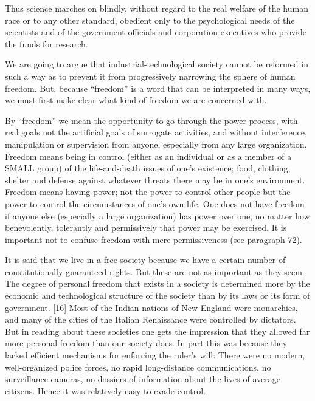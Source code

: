  Thus science marches on blindly, without regard to the real welfare of the human race or to any other standard, obedient only to the psychological needs of the scientists and of the government officials and corporation executives who provide the funds for research.


 We are going to argue that industrial-technological society cannot be reformed in such a way as to prevent it from progressively narrowing the sphere of human freedom. But, because “freedom” is a word that can be interpreted in many ways, we must first make clear what kind of freedom we are concerned with.

 By “freedom” we mean the opportunity to go through the power process, with real goals not the artificial goals of surrogate activities, and without interference, manipulation or supervision from anyone, especially from any large organization. Freedom means being in control (either as an individual or as a member of a SMALL group) of the life-and-death issues of one’s existence; food, clothing, shelter and defense against whatever threats there may be in one’s environment. Freedom means having power; not the power to control other people but the power to control the circumstances of one’s own life. One does not have freedom if anyone else (especially a large organization) has power over one, no matter how benevolently, tolerantly and permissively that power may be exercised. It is important not to confuse freedom with mere permissiveness (see paragraph 72).

 It is said that we live in a free society because we have a certain number of constitutionally guaranteed rights. But these are not as important as they seem. The degree of personal freedom that exists in a society is determined more by the economic and technological structure of the society than by its laws or its form of government. [16] Most of the Indian nations of New England were monarchies, and many of the cities of the Italian Renaissance were controlled by dictators. But in reading about these societies one gets the impression that they allowed far more personal freedom than our society does. In part this was because they lacked efficient mechanisms for enforcing the ruler’s will: There were no modern, well-organized police forces, no rapid long-distance communications, no surveillance cameras, no dossiers of information about the lives of average citizens. Hence it was relatively easy to evade control.


